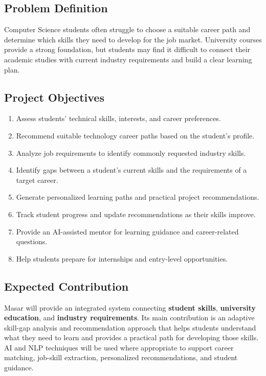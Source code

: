 \documentclass[12pt,a4paper]{article}
\begin{document}
\subsection{Problem Definition}
Computer Science students often struggle to choose a suitable career path and determine which skills they need to develop for the job market. University courses provide a strong foundation, but students may find it difficult to connect their academic studies with current industry requirements and build a clear learning plan.

\subsection{Project Objectives}
\begin{enumerate}[label=\textbf{O\arabic*.}, leftmargin=2cm]
  \item Assess students' technical skills, interests, and career preferences.
  \item Recommend suitable technology career paths based on the student's profile.
  \item Analyze job requirements to identify commonly requested industry skills.
  \item Identify gaps between a student's current skills and the requirements of a target career.
  \item Generate personalized learning paths and practical project recommendations.
  \item Track student progress and update recommendations as their skills improve.
  \item Provide an AI-assisted mentor for learning guidance and career-related questions.
  \item Help students prepare for internships and entry-level opportunities.
\end{enumerate}

\subsection{Expected Contribution}
Masar will provide an integrated system connecting \textbf{student skills}, \textbf{university education}, and \textbf{industry requirements}. Its main contribution is an adaptive skill-gap analysis and recommendation approach that helps students understand what they need to learn and provides a practical path for developing those skills. AI and NLP techniques will be used where appropriate to support career matching, job-skill extraction, personalized recommendations, and student guidance.
\end{document}
